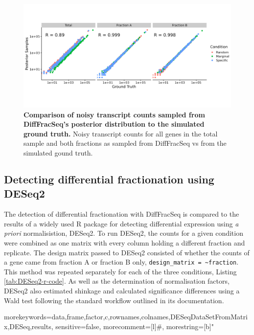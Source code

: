 \documentclass[../main.tex]{subfiles}
\begin{document}
\begin{figure}

{\centering \includegraphics[width=\linewidth]{figures/bayesian_posterior_vs_GT_counts.png} 

}

\caption[DiffFracSeq posterior predictive check]{\textbf{Comparison of noisy transcript counts sampled from DiffFracSeq's posterior distribution to the simulated ground truth.} Noisy transcript counts for all genes in the total sample and both fractions as sampled from DiffFracSeq vs from the simulated gound truth.} \label{fig:simulated-posterior-check}
\end{figure}

\subsection{Detecting differential fractionation using DESeq2}

The detection of differential fractionation with DiffFracSeq is compared to the results of a widely used R package for detecting differential expression using \textit{a priori} normalisistion, DESeq2.
To run DESeq2, the counts for a given condition were combined as one matrix with every column holding a different fraction and replicate. 
The design matrix passed to DESeq2 consisted of whether the counts of a gene came from fraction A or fraction B only, \lstinline{design_matrix = ~fraction}.
This method was repeated separately for each of the three conditions, Listing \ref{tab:DESeq2-r-code}.
As well as the determination of normalisation factors, DESeq2 also estimated shinkage and calculated significance differences using a Wald test following the standard workflow outlined in its documentation. 

{morekeywords={data,frame,factor,c,rownames,colnames,DESeqDataSetFromMatrix,DESeq,results},
sensitive=false,
morecomment=[l]#,
morestring=[b]"}
\end{document}
